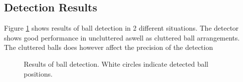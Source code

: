 \subsection{Detection Results}
Figure \ref{fig:detect} shows results of ball detection in 2 different situations. The detector shows good performance in uncluttered aswell as cluttered ball arrangements. The cluttered balls does however affect the precision of the detection

\begin{figure}[H]
  \centering
  \quad           
   \caption{Results of ball detection. White circles indicate detected ball positions.}
  \label{fig:detect}
\end{figure}

